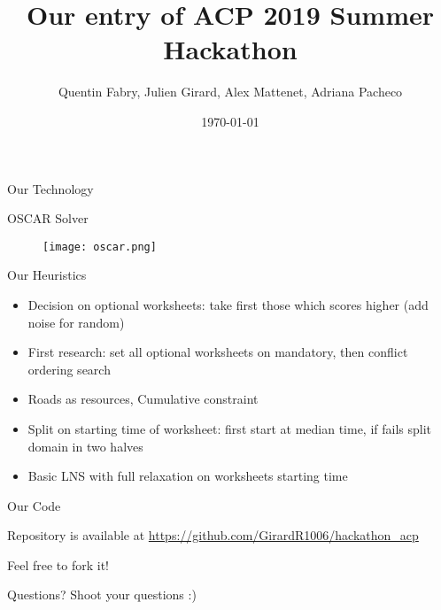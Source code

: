 \documentclass{beamer}
\title{Our entry of ACP 2019 Summer Hackathon}
\author{Quentin Fabry, Julien Girard, Alex Mattenet, Adriana Pacheco}
\date{\today}
\begin{document}
\begin{frame}
        \maketitle
\end{frame}
\begin{frame}{Our Technology}
        
        OSCAR Solver

        \begin{figure}[h!]
            \centering
            \texttt{[image: oscar.png]}
        \end{figure}

\end{frame}

\begin{frame}{Our Heuristics}
    \begin{itemize}
        \item Decision on optional worksheets: take first those which scores
            higher (add noise for random)
        \item First research: set all optional worksheets on mandatory, then
            conflict ordering search
        \item Roads as resources, Cumulative constraint
        \item Split on starting time of worksheet: first start at median time,
            if fails split domain in two halves
        \item Basic LNS with full relaxation on worksheets starting time
    \end{itemize}
\end{frame}

\begin{frame}{Our Code}
\Large
\centering

    Repository is available at
    \href{https://github.com/GirardR1006/hackathon_acp}{https://github.com/GirardR1006/hackathon\_acp}


    Feel free to fork it!
    
\end{frame}

\begin{frame}{Questions?}
\centering
\Huge
Shoot your questions :) 
\end{frame}
\end{document}

